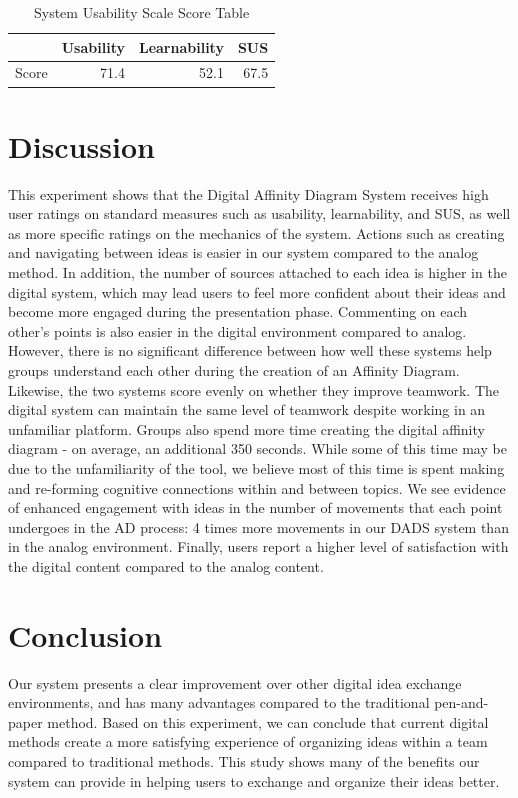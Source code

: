 \documentclass{sigchi}
\begin{document}
\begin{table}[ht]
\centering
\caption{ System Usability Scale Score Table}

\begin{tabular}{rrrr}
  \hline
 & Usability  & Learnability & SUS  \\ 
  \hline
Score  & 71.4 & 52.1 & 67.5 \\ 

   \hline
\end{tabular}
\end{table}


\section{Discussion}

This experiment shows that the Digital Affinity Diagram System receives high user ratings on standard measures such as usability, learnability, and SUS, as well as more specific ratings on the mechanics of the system. Actions such as creating and navigating between ideas is easier in our system compared to the analog method. In addition, the number of sources attached to each idea is higher in the digital system, which may lead users to feel more confident about their ideas and become more engaged during the presentation phase. Commenting on each other's points is also easier in the digital environment compared to analog. However, there is no significant difference between how well these systems help groups understand each other during the creation of an Affinity Diagram. Likewise, the two systems score evenly on whether they improve teamwork. The digital system can maintain the same level of teamwork despite working in an unfamiliar platform. Groups also spend more time creating the digital affinity diagram - on average, an additional 350 seconds.  While some of this time may be due to the unfamiliarity of the tool, we believe most of this time is spent making and re-forming cognitive connections within and between topics. We see evidence of enhanced engagement with ideas in the number of movements that each point undergoes in the AD process: 4 times more movements in our DADS system than in the analog environment. Finally, users report a higher level of satisfaction with the digital content compared to the analog content. 

\section{Conclusion}
Our system presents a clear improvement over other digital idea exchange environments, and has many advantages compared to the traditional pen-and-paper method. Based on this experiment, we can conclude that current digital methods create a more satisfying experience of organizing ideas within a team compared to traditional methods. This study shows many of the benefits our system can provide in helping users to exchange and organize their ideas better. 
\end{document}

